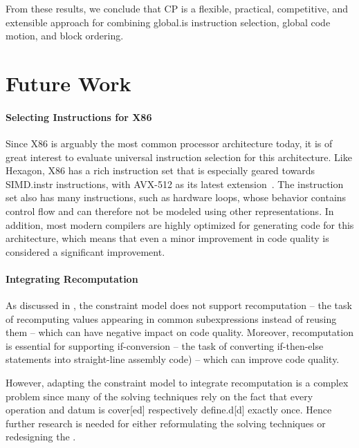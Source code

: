 From these results, we conclude that \glsdesc{CP} is a flexible, practical,
competitive, and extensible approach for combining \gls{global.is}
\gls{instruction selection}, \gls{global code motion}, and \gls{block ordering}.


\section{Future Work}

\paragraph{Selecting Instructions for X86}

Since \gls{X86} is arguably the most common processor architecture today, it is
of great interest to evaluate \gls{universal instruction selection} for this
architecture.
%
Like \gls{Hexagon}, \gls{X86} has a rich \gls{instruction set} that is
especially geared towards \gls{SIMD.instr} \glspl{instruction}, with
\gls{AVX}-512 as its latest extension~\cite{Intel64:2015}.
%
The \gls{instruction set} also has many \glspl{instruction}, such as hardware
loops, whose behavior contains control flow and can therefore not be modeled
using other representations.
%
In addition, most modern \glspl{compiler} are highly optimized for generating
code for this architecture, which means that even a minor improvement in code
quality is considered a significant improvement.


\paragraph{Integrating Recomputation}

As discussed in , the \gls{constraint model} does
not support \gls{recomputation} -- the task of recomputing values appearing in
common subexpressions instead of reusing them -- which can have negative impact
on code quality.
%
Moreover, \gls{recomputation} is essential for supporting \gls{if-conversion} --
the task of converting if-then-else statements into straight-line \gls{assembly
  code}) -- which can improve code quality.

However, adapting the \gls{constraint model} to integrate \gls{recomputation} is
a complex problem since many of the solving techniques rely on the fact that
every \gls{operation} and \gls{datum} is \gls{cover}[ed] respectively
\gls{define.d}[d] exactly once.
%
Hence further research is needed for either reformulating the solving techniques
or redesigning the .


